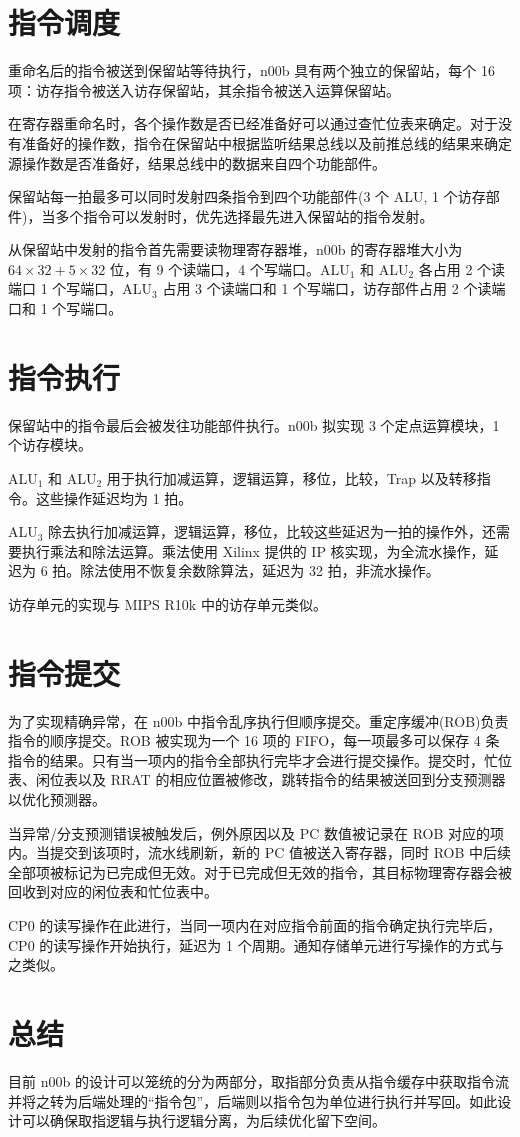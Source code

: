 \documentclass[blue,normal,cn]{elegantnote}
\begin{document}
\section{指令调度}

重命名后的指令被送到保留站等待执行，n00b 具有两个独立的保留站，每个 16 项：访存指令被送入访存保留站，其余指令被送入运算保留站。

在寄存器重命名时，各个操作数是否已经准备好可以通过查忙位表来确定。对于没有准备好的操作数，指令在保留站中根据监听结果总线以及前推总线的结果来确定源操作数是否准备好，结果总线中的数据来自四个功能部件。

保留站每一拍最多可以同时发射四条指令到四个功能部件(3 个 ALU, 1 个访存部件)，当多个指令可以发射时，优先选择最先进入保留站的指令发射。

从保留站中发射的指令首先需要读物理寄存器堆，n00b 的寄存器堆大小为 $64 \times 32 + 5 \times 32$ 位，有 9 个读端口，4 个写端口。ALU$_1$ 和 ALU$_2$ 各占用 2 个读端口 1 个写端口，ALU$_3$ 占用 3 个读端口和 1 个写端口，访存部件占用 2 个读端口和 1 个写端口。

\section{指令执行}

保留站中的指令最后会被发往功能部件执行。n00b 拟实现 3 个定点运算模块，1 个访存模块。

ALU$_1$ 和 ALU$_2$ 用于执行加减运算，逻辑运算，移位，比较，Trap 以及转移指令。这些操作延迟均为 1 拍。

ALU$_3$ 除去执行加减运算，逻辑运算，移位，比较这些延迟为一拍的操作外，还需要执行乘法和除法运算。乘法使用 Xilinx 提供的 IP 核实现，为全流水操作，延迟为 6 拍。除法使用不恢复余数除算法，延迟为 32 拍，非流水操作。

访存单元的实现与 MIPS R10k 中的访存单元类似。

\section{指令提交}
为了实现精确异常，在 n00b 中指令乱序执行但顺序提交。重定序缓冲(ROB)负责指令的顺序提交。ROB 被实现为一个 16 项的 FIFO，每一项最多可以保存 4 条指令的结果。只有当一项内的指令全部执行完毕才会进行提交操作。提交时，忙位表、闲位表以及 RRAT 的相应位置被修改，跳转指令的结果被送回到分支预测器以优化预测器。

当异常/分支预测错误被触发后，例外原因以及 PC 数值被记录在 ROB 对应的项内。当提交到该项时，流水线刷新，新的 PC 值被送入寄存器，同时 ROB 中后续全部项被标记为已完成但无效。对于已完成但无效的指令，其目标物理寄存器会被回收到对应的闲位表和忙位表中。

CP0 的读写操作在此进行，当同一项内在对应指令前面的指令确定执行完毕后，CP0 的读写操作开始执行，延迟为 1 个周期。通知存储单元进行写操作的方式与之类似。

\section{总结}
目前 n00b 的设计可以笼统的分为两部分，取指部分负责从指令缓存中获取指令流并将之转为后端处理的``指令包''，后端则以指令包为单位进行执行并写回。如此设计可以确保取指逻辑与执行逻辑分离，为后续优化留下空间。
\end{document}
